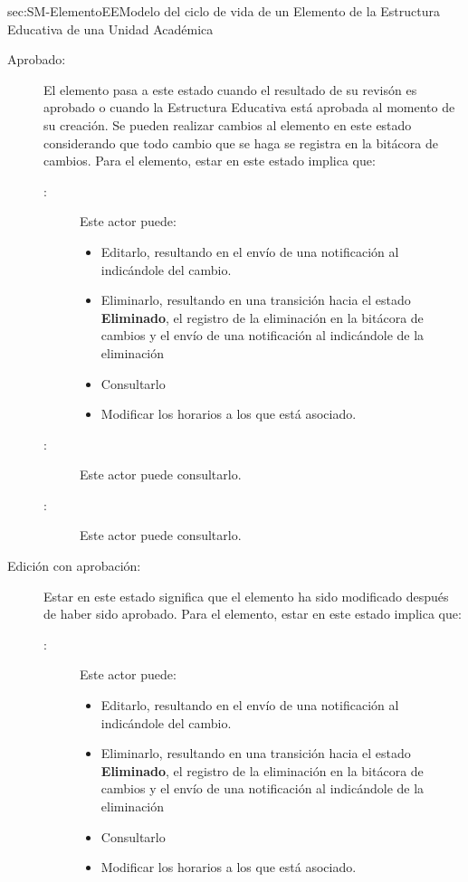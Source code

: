 \begin{Maquina}{sec:SM-ElementoEE}{Modelo del ciclo de vida de un Elemento de la Estructura Educativa de una Unidad Académica}
\begin{description}
\item[Aprobado:] El elemento pasa a este estado cuando el resultado de su revisón es aprobado o cuando la Estructura Educativa está aprobada al momento de su creación. Se pueden realizar cambios al elemento en este estado considerando que todo cambio que se haga se registra en la bitácora de cambios. Para el elemento, estar en este estado implica que:
	\begin{description}
		\item[:] Este actor puede:
		\begin{itemize} 
			\item Editarlo, resultando en el envío de una notificación al  indicándole del cambio.
			\item Eliminarlo, resultando en una transición hacia el estado {\bf Eliminado}, el registro de la eliminación en la bitácora de cambios y el envío de una notificación al  indicándole de la eliminación
			\item Consultarlo 
			\item Modificar los horarios a los que está asociado.
		\end{itemize}
	
		\item[:] Este actor puede consultarlo.

		\item[:] Este actor puede consultarlo.	
	
	\end{description}
	
\item[Edición con aprobación:] Estar en este estado significa que el elemento ha sido modificado después de haber sido aprobado. Para el elemento, estar en este estado implica que:
	\begin{description}
		\item[:] Este actor puede:
		\begin{itemize} 
			\item Editarlo, resultando en el envío de una notificación al  indicándole del cambio.
			\item Eliminarlo, resultando en una transición hacia el estado {\bf Eliminado}, el registro de la eliminación en la bitácora de cambios y el envío de una notificación al  indicándole de la eliminación
			\item Consultarlo 
			\item Modificar los horarios a los que está asociado.
		\end{itemize}
		

\end{description}
\end{description}
\end{Maquina}

